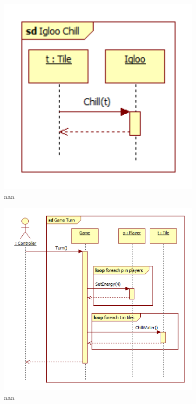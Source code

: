 \begin{figure}[H]
	\begin{center}
		\includegraphics[width=10cm]{chapters/chapter03/seqdiag/Igloo_Chill.png}
		\caption{aaa}
		\label{bbb}
	\end{center}
\end{figure}
\begin{figure}[H]
	\begin{center}
		\includegraphics[width=10cm]{chapters/chapter03/seqdiag/Game_Turn.png}
		\caption{aaa}
		\label{bbb}
	\end{center}
\end{figure}
